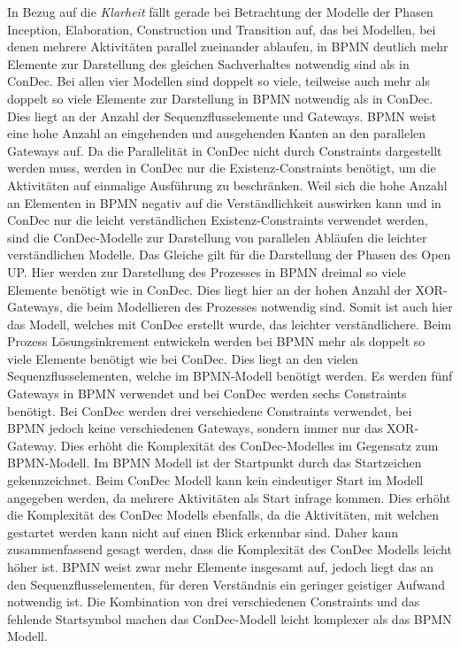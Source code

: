 In Bezug auf die \textit{Klarheit} fällt gerade bei Betrachtung der Modelle der Phasen Inception, Elaboration, Construction und Transition auf, das bei Modellen, bei denen mehrere Aktivitäten parallel zueinander ablaufen, in BPMN deutlich mehr Elemente zur Darstellung des gleichen Sachverhaltes notwendig sind als in ConDec. Bei allen vier Modellen sind doppelt so viele, teilweise auch mehr als doppelt so viele Elemente zur Darstellung in BPMN notwendig als in ConDec. Dies liegt an der Anzahl der Sequenzflusselemente und Gateways. BPMN weist eine hohe Anzahl an eingehenden und ausgehenden Kanten an den parallelen Gateways auf. Da die Parallelität in ConDec nicht durch Constraints dargestellt werden muss, werden in ConDec nur die Existenz-Constraints benötigt, um die Aktivitäten auf einmalige Ausführung zu beschränken. Weil sich die hohe Anzahl an Elementen in BPMN negativ auf die Verständlichkeit auswirken kann und in ConDec nur die leicht verständlichen Existenz-Constraints verwendet werden, sind die ConDec-Modelle zur Darstellung von parallelen Abläufen die leichter verständlichen Modelle. \newline
Das Gleiche gilt für die Darstellung der Phasen des Open UP. Hier werden zur Darstellung des Prozesses in BPMN dreimal so viele Elemente benötigt wie in ConDec. Dies liegt hier an der hohen Anzahl der XOR-Gateways, die beim Modellieren des Prozesses notwendig sind. Somit ist auch hier das Modell, welches mit ConDec erstellt wurde, das leichter verständlichere. \newline
Beim Prozess Lösungsinkrement entwickeln werden bei BPMN mehr als doppelt so viele Elemente benötigt wie bei ConDec. Dies liegt an den vielen Sequenzflusselementen, welche im BPMN-Modell benötigt werden. Es werden fünf Gateways in BPMN verwendet und bei ConDec werden sechs Constraints benötigt. Bei ConDec werden drei verschiedene Constraints verwendet, bei BPMN jedoch keine verschiedenen Gateways, sondern immer nur das XOR- Gateway. Dies erhöht die Komplexität des ConDec-Modelles im Gegensatz zum BPMN-Modell. Im BPMN Modell ist der Startpunkt durch das Startzeichen gekennzeichnet. Beim ConDec Modell kann kein eindeutiger Start im Modell angegeben werden, da mehrere Aktivitäten als Start infrage kommen. Dies erhöht die Komplexität des ConDec Modells ebenfalls, da die Aktivitäten, mit welchen gestartet werden kann nicht auf einen Blick erkennbar sind. Daher kann zusammenfassend gesagt werden, dass die Komplexität des ConDec Modells leicht höher ist. BPMN weist zwar mehr Elemente insgesamt auf, jedoch liegt das an den Sequenzflusselementen, für deren Verständnis ein geringer geistiger Aufwand notwendig ist. Die Kombination von drei verschiedenen Constraints und das fehlende Startsymbol machen das ConDec-Modell leicht komplexer als das BPMN Modell.\newline
